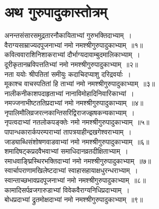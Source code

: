 \documentclass[twoside,12pt,notitlepage]{book}
\begin{document}
\frontmatter

\bfseries
\thispagestyle{empty}
\fontsize{14}{16}\selectfont
\tableofcontents
\clearpage

\mainmatter

\renewcommand{\thepage}{\devanagarinumeral{page}}
\thispagestyle{empty}
\section[गुरुपादुकास्तोत्रम्]{अथ  गुरुपादुकास्तोत्रम्}

\noindent अनन्तसंसारसमुद्रतारनौकायिताभ्यां गुरुभक्तिदाभ्याम्~। \\[-6pt]
वैराग्यसाम्राज्यदपूजनाभ्यां नमो नमश्श्रीगुरुपादुकाभ्याम्~॥१॥\\
कवित्ववाराशिनिशाकराभ्यां दौर्भाग्यदावाम्बुदमालिकाभ्याम्~।\\[-6pt]
दूरीकृतानम्रविपत्ततिभ्यां नमो नमश्श्रीगुरुपादुकाभ्याम्~॥२॥\\
नता ययोः श्रीपतितां समीयुः कदाचिदप्याशु दरिद्रवर्याः~।\\[-6pt]
मूकाश्च वाचस्पतितां हि ताभ्यां नमो नमश्श्रीगुरुपादुकाभ्याम्~॥३॥\\
नालीकनीकाशपदाहृताभ्यां नानाविमोहादिनिवारिकाभ्यां~।\\[-6pt]
नमज्जनाभीष्टततिप्रदाभ्यां नमो नमश्श्रीगुरुपादुकाभ्याम्~॥४॥\\
नृपालिमौलिव्रजरत्नकान्तिसरिद्विराजज्झषकन्यकाभ्याम्~।\\[-6pt]
नृपत्वदाभ्यां नतलोकपङ्क्तेः नमो नमश्श्रीगुरुपादुकाभ्याम्~॥५॥\\
पापान्धकारार्कपरम्पराभ्यां तापत्रयाहीन्द्रखगेश्वराभ्याम्~।\\[-6pt]
जाड्याब्धिसंशोषणवाडवाभ्यां नमो नमश्श्रीगुरुपादुकाभ्याम्~॥६॥\\
शमादिषट्कप्रदवैभवाभ्यां समाधिदानव्रतदीक्षिताभ्याम्~।\\[-6pt]
रमाधवाङ्घ्रिस्थिरभक्तिदाभ्यां नमो नमश्श्रीगुरुपादुकाभ्याम्~॥७॥\\
स्वार्चापराणामखिलेष्टदाभ्यां स्वाहासहायाक्षधुरन्धराभ्याम्~।\\[-6pt]
स्वान्ताच्छभावप्रदपूजनाभ्यां नमो नमश्श्रीगुरुपादुकाभ्याम्~॥८॥\\
कामादिसर्पव्रजगारुडाभ्यां विवेकवैराग्यनिधिप्रदाभ्याम्~।\\[-6pt]
बोधप्रदाभ्यां द्रुतमोक्षदाभ्यां नमो नमश्श्रीगुरुपादुकाभ्याम्~॥९॥


\clearpage
\end{document}
